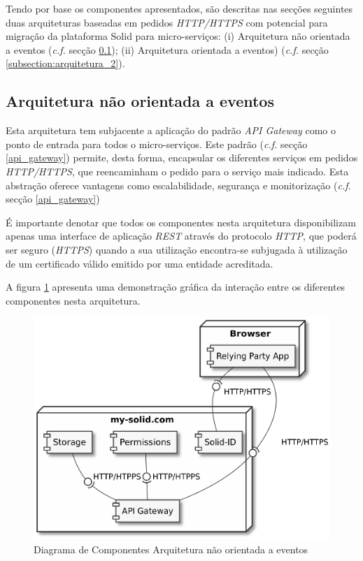 Tendo por base os componentes apresentados, são descritas nas secções seguintes duas arquiteturas baseadas em pedidos \emph{HTTP/HTTPS} com potencial para migração da plataforma Solid para micro-serviços: (i) Arquitetura não orientada a eventos  (\emph{c.f.} secção \ref{subsection:arquitetura_1}); (ii) Arquitetura orientada a eventos) (\emph{c.f.} secção \ref{subsection:arquitetura_2}).

\subsection{Arquitetura não orientada a eventos} \label{subsection:arquitetura_1}

Esta arquitetura tem subjacente a aplicação do padrão \emph{API Gateway} como o ponto de entrada para todos o micro-serviços. Este padrão (\emph{c.f.} secção \ref{api_gateway}) permite, desta forma, encapsular os diferentes serviços em pedidos \emph{HTTP/HTTPS}, que reencaminham o pedido para o serviço mais indicado. Esta abstração oferece vantagens como escalabilidade, segurança e monitorização (\emph{c.f.} secção \ref{api_gateway})

É importante denotar que todos os componentes nesta arquitetura disponibilizam apenas uma interface de aplicação \emph{\acrshort{REST}} através do protocolo \emph{HTTP}, que poderá ser seguro (\emph{HTTPS}) quando a sua utilização encontra-se subjugada à utilização de um certificado válido emitido por uma entidade acreditada.

A figura \ref{component_diagram_arquitetura1} apresenta uma demonstração gráfica da interação entre os diferentes componentes nesta arquitetura.

\begin{figure}[H]
    \begin{center}
    \includegraphics[width=0.6 \textwidth]{figures/arquitetura_1_diagrama_componentes.eps}
    \caption{Diagrama de Componentes Arquitetura não orientada a eventos}
    \label{component_diagram_arquitetura1}
    \end{center}
\end{figure}

